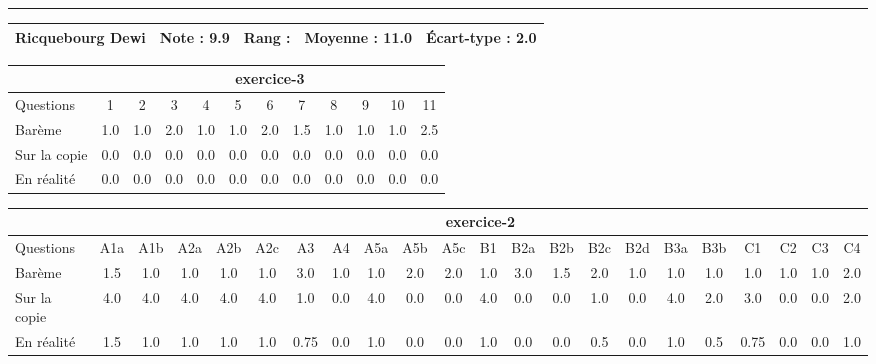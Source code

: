 \documentclass[a4paper, landscape, 10pt]{article}
\begin{document}
\begin{minipage}{\textwidth}
  \end{minipage}
  \vspace{0.3cm}
  \hrule
  \vspace{0.3cm}

  \begin{minipage}{\textwidth}
    { \bf
    \begin{tabular}{|c|*{4}{c|}}
    \hline
      Ricquebourg Dewi & Note : 9.9 & Rang :  & Moyenne : 11.0 & \'Ecart-type : 2.0 \\
    \hline
    \end{tabular}
    }
    
      \begin{tabular}{|l|*{ 11 }{c|}}
        \hline
        & \multicolumn{ 11 }{c|}{ exercice-3 } \\
        \hline
        Questions & 1&2&3&4&5&6&7&8&9&10&11 \\
        \hline
        Barème & 1.0&1.0&2.0&1.0&1.0&2.0&1.5&1.0&1.0&1.0&2.5 \\
        \hline
        Sur la copie & 0.0&0.0&0.0&0.0&0.0&0.0&0.0&0.0&0.0&0.0&0.0 \\
        \hline
        En réalité & 0.0&0.0&0.0&0.0&0.0&0.0&0.0&0.0&0.0&0.0&0.0 \\
        \hline
      \end{tabular}
    
      \begin{tabular}{|l|*{ 21 }{c|}}
        \hline
        & \multicolumn{ 21 }{c|}{ exercice-2 } \\
        \hline
        Questions & A1a&A1b&A2a&A2b&A2c&A3&A4&A5a&A5b&A5c&B1&B2a&B2b&B2c&B2d&B3a&B3b&C1&C2&C3&C4 \\
        \hline
        Barème & 1.5&1.0&1.0&1.0&1.0&3.0&1.0&1.0&2.0&2.0&1.0&3.0&1.5&2.0&1.0&1.0&1.0&1.0&1.0&1.0&2.0 \\
        \hline
        Sur la copie & 4.0&4.0&4.0&4.0&4.0&1.0&0.0&4.0&0.0&0.0&4.0&0.0&0.0&1.0&0.0&4.0&2.0&3.0&0.0&0.0&2.0 \\
        \hline
        En réalité & 1.5&1.0&1.0&1.0&1.0&0.75&0.0&1.0&0.0&0.0&1.0&0.0&0.0&0.5&0.0&1.0&0.5&0.75&0.0&0.0&1.0 \\
        \hline
      \end{tabular}
    

\end{minipage}
\end{document}
